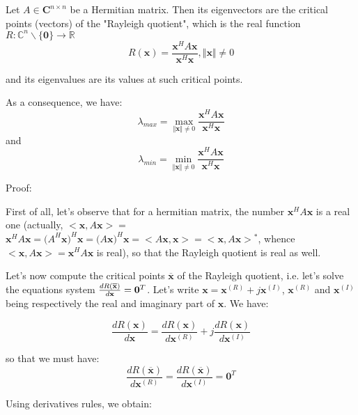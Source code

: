 \documentclass[12pt]{article}
\begin{document}
Let $A\in \mathbf{C}^{n\times n}$ be a Hermitian matrix. Then its
eigenvectors are the critical points (vectors) of the "Rayleigh quotient",
which is the real function $R:\mathbb{C}^{n}\backslash \{\mathbf{0}%
\}\rightarrow \mathbb{R}$%
\begin{equation*}
R(\mathbf{x})=\frac{\mathbf{x}^{H}A\mathbf{x}}{\mathbf{x}^{H}\mathbf{x}},\Vert \mathbf{x}\Vert \neq 0
\end{equation*}

and its eigenvalues are its values at such critical points.

As a consequence, we have:
\begin{equation*}
\lambda_{max}=\max_{\Vert \mathbf{x}\Vert \neq 0}\frac{\mathbf{x}^{H}A\mathbf{x}}{\mathbf{x}^{H}\mathbf{x}}
\end{equation*}
and
\begin{equation*}
\lambda_{min}=\min_{\Vert \mathbf{x}\Vert \neq 0}\frac{\mathbf{x}^{H}A\mathbf{x}}{\mathbf{x}^{H}\mathbf{x}}
\end{equation*}

Proof:

First of all, let's observe that for a hermitian matrix, the number $\mathbf{x}^{H}A\mathbf{x}$ is a real one (actually, $<\mathbf{x},A\mathbf{x}>=$ $%
\mathbf{x}^{H}A\mathbf{x=(}A^{H}\mathbf{x)}^{H}\mathbf{x=(}A\mathbf{x)}^{H}%
\mathbf{x=}<A\mathbf{x},\mathbf{x>=}<\mathbf{x},A\mathbf{x>}^{\ast }$,
whence $<\mathbf{x},A\mathbf{x>=x}^{H}A\mathbf{x}$ is real), so that the
Rayleigh quotient is real as well.

Let's now compute the critical points $\overline{\mathbf{x}}$ of the
Rayleigh quotient, i.e. let's solve the equations system $\frac{dR(\overline{%
\mathbf{x}})}{d\mathbf{x}}=\mathbf{0}^{T}$. Let's write $\mathbf{x=x}^{(R)}+j%
\mathbf{x}^{(I)}$, $\mathbf{x}^{(R)}$ and $\mathbf{x}^{(I)}$ being
respectively the real and imaginary part of $\mathbf{x}$. We have:

\begin{equation*}
\frac{dR(\mathbf{x})}{d\mathbf{x}}=\frac{dR(\mathbf{x})}{d\mathbf{x}^{(R)}}+j\frac{dR(\mathbf{x})}{d\mathbf{x}^{(I)}}
\end{equation*}

so that we must have:%
\begin{equation*}
\frac{dR(\overline{\mathbf{x}})}{d\mathbf{x}^{(R)}}=\frac{dR(\overline{\mathbf{x}})}{d\mathbf{x}^{(I)}}=\mathbf{0}^{T}
\end{equation*}

Using derivatives rules, we obtain:
\end{document}
